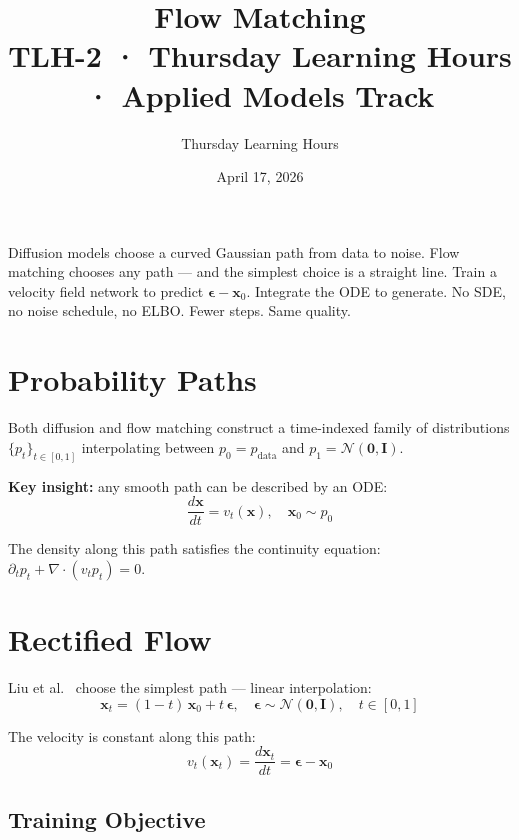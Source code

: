 \documentclass[11pt, a4paper]{article}
\title{\color{copper}\textbf{Flow Matching}\\[4pt]
  \large TLH-2 · Thursday Learning Hours · Applied Models Track}
\author{Thursday Learning Hours}
\date{April 17, 2026}
\theoremstyle{definition}
\newcommand{\bx}{\bm{x}}
\newcommand{\bepsilon}{\bm{\epsilon}}
\begin{document}
\maketitle

\begin{tcolorbox}[colback=ivory, colframe=copper, title=\textbf{Core Thesis}]
Diffusion models choose a curved Gaussian path from data to noise. Flow matching chooses
any path — and the simplest choice is a straight line. Train a velocity field network to
predict $\bepsilon - \bx_0$. Integrate the ODE to generate. No SDE, no noise schedule,
no ELBO. Fewer steps. Same quality.
\end{tcolorbox}

\tableofcontents
\newpage

\section{Probability Paths}

Both diffusion and flow matching construct a time-indexed family of distributions
$\{p_t\}_{t \in [0,1]}$ interpolating between $p_0 = p_\text{data}$ and $p_1 = \mathcal{N}(\bm{0}, \bm{I})$.

\textbf{Key insight:} any smooth path can be described by an ODE:
\begin{equation}
  \frac{d\bx}{dt} = v_t(\bx), \quad \bx_0 \sim p_0
  \label{eq:ode}
\end{equation}

The density along this path satisfies the continuity equation:
$\partial_t p_t + \nabla \cdot (v_t p_t) = 0$.

\section{Rectified Flow}

Liu et al.~\cite{liu2022rf} choose the simplest path — linear interpolation:
\begin{equation}
  \bx_t = (1-t)\,\bx_0 + t\,\bepsilon, \quad \bepsilon \sim \mathcal{N}(\bm{0}, \bm{I}), \quad t \in [0,1]
  \label{eq:rf_path}
\end{equation}

The velocity is constant along this path:
\begin{equation}
  v_t(\bx_t) = \frac{d\bx_t}{dt} = \bepsilon - \bx_0
\end{equation}

\subsection{Training Objective}
\end{document}
